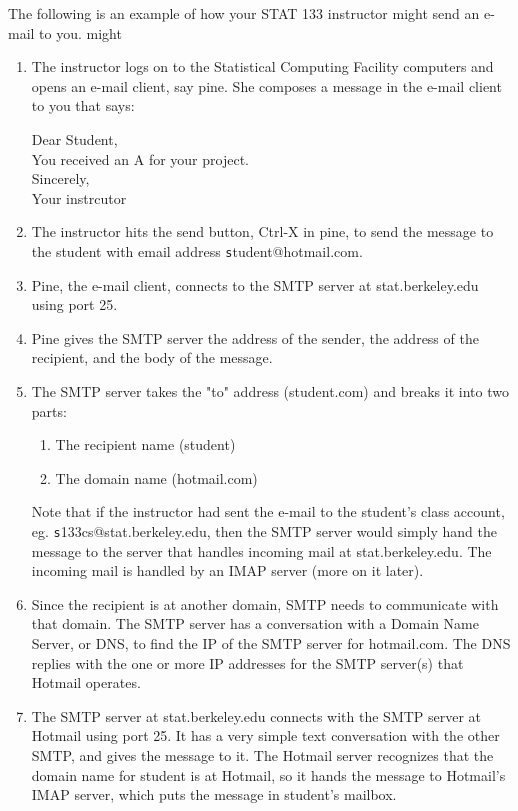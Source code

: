 \documentclass[12pt]{article}
\begin{document}
The following is an example of how your STAT 133 instructor
might send an e-mail to you. might

\begin{enumerate}
\item The instructor logs on to the Statistical Computing Facility
computers and opens an e-mail client, say pine. 
She composes a message in the e-mail client to you that says:

 Dear Student, \\ 
   You received an A for your project.\\
 Sincerely,\\
 Your instrcutor 

\item The instructor hits the send button, Ctrl-X in pine, to send the message
to the student with email address {\texttt student@hotmail.com}.

\item Pine, the e-mail client, connects to the SMTP server at 
stat.berkeley.edu using port 25.

\item Pine gives the SMTP server the address of the
sender, the address of the recipient, 
and the body of the message.

\item The SMTP server takes the "to" address 
(student\@hotmail.com) and breaks it into two parts:

\begin{enumerate}
\item The recipient name (student)
\item The domain name (hotmail.com) 
\end{enumerate}

Note that if the instructor had sent the e-mail to the
student's class account, eg. {\texttt s133cs@stat.berkeley.edu},
then the SMTP server would simply hand the message 
to the server that handles incoming mail at 
stat.berkeley.edu.  The incoming mail is handled by an IMAP server 
(more on it later).

\item Since the recipient is at another domain, 
SMTP needs to communicate with that domain.
The SMTP server has a conversation with a 
Domain Name Server, or DNS, to find the IP of the 
SMTP server for hotmail.com. 
The DNS replies with the one or more IP addresses 
for the SMTP server(s) that Hotmail operates.

\item
The SMTP server at stat.berkeley.edu
connects with the SMTP server at Hotmail using port 25. 
It has a very simple text conversation with the other SMTP,
and gives the message to it. 
The Hotmail server recognizes that the domain name 
for student is at Hotmail, 
so it hands the message to Hotmail's IMAP server, 
which puts the message in student's mailbox. 
\end{enumerate}
\end{document}
